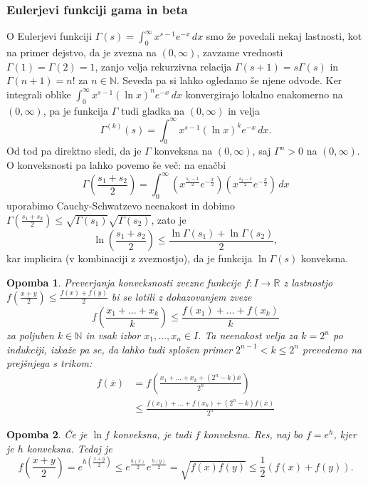 \documentclass[10pt, a4paper]{article}
\newtheorem*{opomba}{Opomba}
\newcommand{\N}{\mathbb {N}}
\newcommand{\R}{\mathbb {R}}
\begin{document}
\subsubsection{Eulerjevi funkciji gama in beta}

O Eulerjevi funkciji $\Gamma (s) = \int_0 ^\infty x^{s - 1} e^{-x}\, dx$
smo že povedali nekaj lastnosti, kot na primer dejstvo, da je zvezna na $(0, \infty)$,
zavzame vrednosti $\Gamma (1) = \Gamma(2) = 1$, zanjo velja rekurzivna relacija $\Gamma(s + 1) = s \Gamma(s)$
in $\Gamma(n + 1) = n!$ za $n \in \N$. Seveda pa si lahko ogledamo še njene odvode.
Ker integrali oblike $\int_0 ^\infty x^{s - 1} (\ln x)^n e^{-x}\, dx$
konvergirajo lokalno enakomerno na $(0, \infty)$, pa je 
funkcija $\Gamma$ tudi gladka na $(0, \infty)$ in velja 
$$\Gamma^{(k)} (s) = \int_0 ^\infty x^{s - 1} (\ln x)^k e^{-x}\, dx.$$
Od tod pa direktno sledi, da je $\Gamma$ konveksna na $(0, \infty)$,
saj $\Gamma^n > 0$ na $(0, \infty)$. O konveksnosti pa lahko povemo še več:
na enačbi $$\Gamma \left(\frac{s_1 + s_2}{2}\right) = \int_0 ^\infty \left(x^\frac{s_1 - 1}{2} e^{-\frac{x}{2}}\right) \left(x^\frac{s_2 - 1}{2} e^{-\frac{x}{2}}\right)\, dx$$
uporabimo Cauchy-Schwatzevo neenakost in dobimo 
$\Gamma \left(\frac{s_1 + s_2}{2}\right) \leq \sqrt{\Gamma(s_1)} \sqrt{\Gamma(s_2)}$,
zato je $$\ln \left(\frac{s_1 + s_2}{2}\right) \leq \frac{\ln \Gamma(s_1) + \ln \Gamma(s_2)}{2},$$
kar implicira (v kombinaciji z zveznostjo), da je funkcija $\ln \Gamma(s)$ konveksna.

\begin{opomba}
    Preverjanja konveksnosti zvezne funkcije $f: I \to \R$ z lastnostjo $f\left(\frac{x + y}{2}\right) \leq \frac{f(x) + f(y)}{2}$ bi se lotili z dokazovanjem
    zveze $$f \left(\frac{x_1 + \dots + x_k}{k}\right) \leq \frac{f(x_1) + \dots + f(x_k)}{k}$$ za poljuben $k \in \N$
    in vsak izbor $x_1, \dots, x_n \in I$. Ta neenakost velja za $k = 2^n$ po indukciji,
    izkaže pa se, da lahko tudi splošen primer $2^{n - 1} < k \leq 2^n$ prevedemo na prejšnjega s trikom:
    \begin{align*}
        f(\overline{x}) &= f \left(\frac{x_1 + \dots + x_k + (2^n - k)\overline{x}}{2^n}\right)\\
        &\leq \frac{f(x_1) + \dots + f(x_k) + (2^n - k)f(\overline{x})}{2^n}
    \end{align*}
\end{opomba}

\begin{opomba}
    Če je $\ln f$ konveksna, je tudi $f$ konveksna.
    Res, naj bo $f = e^h$, kjer je $h$ konveksna.
    Tedaj je $$f\left(\frac{x+y}{2}\right) = e^{h\left(\frac{x+y}{2}\right)} \leq e^{\frac{h(x)}{2}} e^{\frac{h(y)}{2}} = \sqrt{f(x)f(y)} \leq \frac{1}{2} (f(x) + f(y)).$$ 
\end{opomba}
\end{document}
